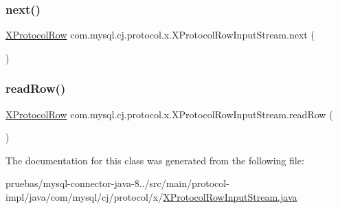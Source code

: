 \subsubsection{\texorpdfstring{next()}{next()}}
{\footnotesize\ttfamily \mbox{\hyperlink{classcom_1_1mysql_1_1cj_1_1protocol_1_1x_1_1_x_protocol_row}{X\+Protocol\+Row}} com.\+mysql.\+cj.\+protocol.\+x.\+X\+Protocol\+Row\+Input\+Stream.\+next (\begin{DoxyParamCaption}{ }\end{DoxyParamCaption})}

\mbox{\label{classcom_1_1mysql_1_1cj_1_1protocol_1_1x_1_1_x_protocol_row_input_stream_afef0e6619e835e11b0b3e2fb4b10edec}} 
\subsubsection{\texorpdfstring{read\+Row()}{readRow()}}
{\footnotesize\ttfamily \mbox{\hyperlink{classcom_1_1mysql_1_1cj_1_1protocol_1_1x_1_1_x_protocol_row}{X\+Protocol\+Row}} com.\+mysql.\+cj.\+protocol.\+x.\+X\+Protocol\+Row\+Input\+Stream.\+read\+Row (\begin{DoxyParamCaption}{ }\end{DoxyParamCaption})}



The documentation for this class was generated from the following file\+:\begin{DoxyCompactItemize}
\item 
pruebas/mysql-\/connector-\/java-\/8../src/main/protocol-\/impl/java/com/mysql/cj/protocol/x/\mbox{\hyperlink{_x_protocol_row_input_stream_8java}{X\+Protocol\+Row\+Input\+Stream.\+java}}\end{DoxyCompactItemize}
